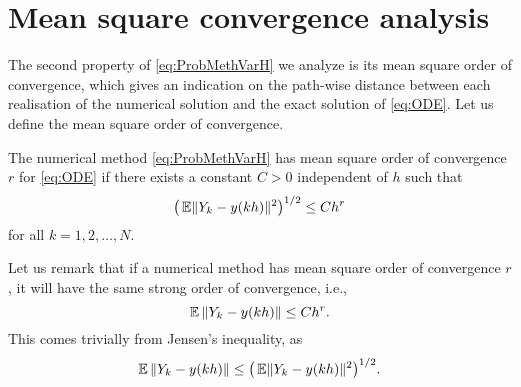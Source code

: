 \documentclass{siamart1116}
\numberwithin{theorem}{section}
\DeclarePairedDelimiter{\norm}{\|}{\|}
\newcommand{\E}{\operatorname{\mathbb{E}}}
\begin{document}
\section{Mean square convergence analysis}\label{sec:StrongOrder}

The second property of \eqref{eq:ProbMethVarH} we analyze is its mean square order of convergence, which gives an indication on the path-wise distance between each realisation of the numerical solution and the exact solution of \eqref{eq:ODE}. Let us define the mean square order of convergence. 
\begin{definition} The numerical method \eqref{eq:ProbMethVarH} has mean square order of convergence $r$ for \eqref{eq:ODE} if there exists a constant $C > 0$ independent of $h$ such that
	\begin{equation}
	\big(\E\norm{Y_k - y(kh)}^2\big)^{1/2} \leq Ch^r
	\end{equation}
	for all $k = 1, 2, \ldots, N$.
\end{definition} 
\begin{remark} Let us remark that if a numerical method has mean square order of convergence $r$, it will have the same strong order of convergence, i.e., 
	\begin{equation}
		\E{\norm{Y_k - y(kh)}} \leq Ch^r.
	\end{equation}	
	This comes trivially from Jensen's inequality, as
	\begin{equation}
		\E{\norm{Y_k - y(kh)}} \leq \big(\E\norm{Y_k - y(kh)}^2\big)^{1/2}.
	\end{equation}
\end{remark}
\end{document}
